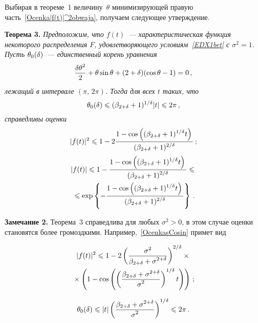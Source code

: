 \begin{multicols}{2}
Выбирая в теореме~1 величину~$\theta$
минимизирующей правую часть~\eqref{Ocenka|f(t)|^2obwaja}, получаем
следующее утверждение.

\medskip

\noindent
\textbf{Теорема 3.}
\textit{Предположим, что $f(t)$~--- характеристическая функция некоторого
распределения $F$, удовлетворяющего условиям~\eqref{EDX1bet} с
$\sigma^2=1$. Пусть $\theta_0(\delta)$~--- единственный корень уравнения}
$$
\displaystyle\frac{\displaystyle \delta\theta^2\mathstrut}{\displaystyle 2\mathstrut}+ \theta\sin \theta + (2+\delta)(\cos \theta - 1)=0\,,
$$
\textit{лежащий в интервале $(\pi,\,2\pi)$. Тогда для всех  $t$ таких, что}
$$
\theta_0(\delta)\leqslant (\beta_{2+\delta}+1)^{1/\delta}|t|  \leqslant2\pi\,,
$$
\textit{справедливы оценки}
\begin{equation}
\label{OcenkasCosin}
|f(t)|^2\leqslant1- 2 \displaystyle\frac{\displaystyle 1-\cos\left((\beta_{2+\delta}+1)^{1/\delta} t\right)\mathstrut}{\displaystyle (\beta_{2+\delta}+1)^{2/\delta}\mathstrut}\,;
\end{equation}
\begin{multline}
\label{OcenkaLgf(t)Cos}
|f(t)|\leqslant 1-\displaystyle\frac{\displaystyle 1-\cos\left((\beta_{2+\delta}+1)^{1/\delta} t\right)\mathstrut}{\displaystyle (\beta_{2+\delta}+1)^{2/\delta}\mathstrut}\leqslant{}\\
{}\leqslant
\exp\left\{-\displaystyle\frac{\displaystyle 1-\cos\left((\beta_{2+\delta}+1)^{1/\delta} t\right)\mathstrut}{\displaystyle (\beta_{2+\delta}+1)^{2/\delta}\mathstrut}\right\}\,.
\end{multline}

\medskip

\noindent
\textbf{Замечание 2.}
Теорема~3 справедлива для любых $\sigma^2>0$, в этом
случае оценки становятся более громоздкими.
Например,~\eqref{OcenkasCosin} примет вид

\noindent
\begin{multline*}
|f(t)|^2\leqslant1- 2
\left(\displaystyle\frac{\displaystyle \sigma^2\mathstrut}{\displaystyle \beta_{2+\delta}+\sigma^{2+\delta}\mathstrut}\right)^{2/\delta}\times{}\\
{}\times
\left(1-\cos\left(\left(\displaystyle\frac{\displaystyle \beta_{2+\delta}+
\sigma^{2+\delta}\mathstrut}{\displaystyle \sigma^2\mathstrut}\right)^{1/\delta} t\right)\right)\,;
\end{multline*}
\vspace*{-6pt}

\noindent
$$
\theta_0(\delta)\leqslant
|t|\left(\displaystyle\frac{\displaystyle \beta_{2+\delta}+\sigma^{2+\delta}\mathstrut}{\displaystyle \sigma^2\mathstrut}\right)^{1/{\delta}}
 \leqslant2\pi\,.
$$

\medskip


\end{multicols}
